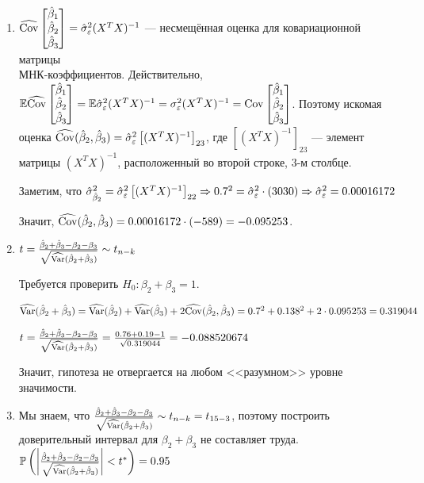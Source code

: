 \documentclass[pdftex,11pt,openany]{book}\usepackage[]{graphicx}\usepackage[]{color}
\begin{document}
\begin{solution}
\begin{enumerate}
\item $\widehat{\operatorname{Cov}}\begin{bmatrix}
\hat{\beta}_1 \\
\hat{\beta}_2 \\
\hat{\beta}_3 \\
\end{bmatrix} = \hat{\sigma}_{\varepsilon}^2 (X^TX)^{-1}$ --- несмещённая оценка для ковариационной матрицы \\ МНК-коэффициентов. Действительно, $\mathbb{E}\widehat{\operatorname{Cov}}\begin{bmatrix}
\hat{\beta}_1 \\
\hat{\beta}_2 \\
\hat{\beta}_3 \\
\end{bmatrix} = \mathbb{E}\hat{\sigma}_{\varepsilon}^2 (X^TX)^{-1} = \sigma_{\varepsilon}^2 (X^TX)^{-1} = \operatorname{Cov}\begin{bmatrix}
\hat{\beta}_1 \\
\hat{\beta}_2 \\
\hat{\beta}_3 \\
\end{bmatrix}$. Поэтому искомая оценка $\widehat{\operatorname{Cov}}(\hat{\beta}_2, \hat{\beta}_3) = \hat{\sigma}_{\varepsilon}^2 \left[ (X^T X)^{-1} \right]_{23}$, где $\left[ (X^T X)^{-1} \right]_{23}$ --- элемент матрицы $(X^T X)^{-1}$, расположенный во второй строке, 3-м столбце.

Заметим, что $\hat{\sigma}_{\hat{\beta}_2}^2 = \hat{\sigma}_{\varepsilon}^2 \left[ (X^T X)^{-1} \right]_{22} \Rightarrow 0.7^2 = \hat{\sigma}_{\varepsilon}^2 \cdot (3030) \Rightarrow \hat{\sigma}_{\varepsilon}^2 = 0.00016172$

Значит, $\widehat{\operatorname{Cov}}(\hat{\beta}_2, \hat{\beta}_3) = 0.00016172 \cdot (-589) = -0.095253$.

\item $t = \frac{\hat{\beta}_2 + \hat{\beta}_3 - \beta_2 - \beta_3}{\sqrt{\widehat{\operatorname{Var}}(\hat{\beta}_2 + \hat{\beta}_3)}} \sim t_{n-k}$

Требуется проверить $H_0: \beta_2 + \beta_3 = 1$.

$\widehat{\operatorname{Var}}(\hat{\beta}_2 + \hat{\beta}_3) = \widehat{\operatorname{Var}}(\hat{\beta}_2) + \widehat{\operatorname{Var}}(\hat{\beta}_3) + 2\widehat{\operatorname{Cov}}(\hat{\beta}_2, \hat{\beta}_3) = 0.7^2 + 0.138^2 + 2 \cdot 0.095253 = 0.319044$

$t = \frac{\hat{\beta}_2 + \hat{\beta}_3 - \beta_2 - \beta_3}{\sqrt{\widehat{\operatorname{Var}}(\hat{\beta}_2 + \hat{\beta}_3)}} = \frac{0.76 + 0.19 - 1}{\sqrt{0.319044}} = -0.088520674$

Значит, гипотеза не отвергается на любом <<разумном>> уровне значимости.

\item Мы знаем, что $\frac{\hat{\beta}_2 + \hat{\beta}_3 - \beta_2 - \beta_3}{\sqrt{\widehat{\operatorname{Var}}(\hat{\beta}_2 + \hat{\beta}_3)}} \sim t_{n-k} = t_{15-3}$, поэтому построить доверительный интервал для $\beta_2 + \beta_3$ не составляет труда. $\mathbb{P}\left( \left| \frac{\hat{\beta}_2 + \hat{\beta}_3 - \beta_2 - \beta_3}{\sqrt{\widehat{\operatorname{Var}}(\hat{\beta}_2 + \hat{\beta}_3)}} \right| < t^* \right) = 0.95$


\end{enumerate}
\end{solution}
\end{document}
